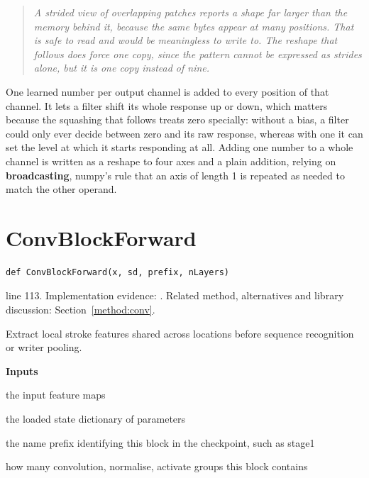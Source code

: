 \begin{quote}\small\itshape A strided view of overlapping patches reports a shape far larger than the memory behind it, because the same bytes appear at many positions. That is safe to read and would be meaningless to write to. The reshape that follows does force one copy, since the pattern cannot be expressed as strides alone, but it is one copy instead of nine.\end{quote}

One learned number per output channel is added to every position of that channel. It lets a filter shift its whole response up or down, which matters because the squashing that follows treats zero specially: without a bias, a filter could only ever decide between zero and its raw response, whereas with one it can set the level at which it starts responding at all. Adding one number to a whole channel is written as a reshape to four axes and a plain addition, relying on \textbf{broadcasting}, numpy's rule that an axis of length 1 is repeated as needed to match the other operand.



\section{ConvBlockForward}\label{fn:recognise:ConvBlockForward}
\begin{lstlisting}[style=sig]
def ConvBlockForward(x, sd, prefix, nLayers)
\end{lstlisting}
 line 113. Implementation evidence: \cite{code2026}. Related method, alternatives and library discussion: Section~\ref{method:conv}.


Extract local stroke features shared across locations before sequence recognition or writer pooling.




\noindent\textbf{Inputs}
\begin{description}[leftmargin=2.2em,style=nextline,font=\normalfont\ttfamily]\setlength\itemsep{1pt}
  \item[{x}] \normalfont the input feature maps
  \item[{sd}] \normalfont the loaded state dictionary of parameters
  \item[{prefix}] \normalfont the name prefix identifying this block in the checkpoint, such as stage1
  \item[{nLayers}] \normalfont how many convolution, normalise, activate groups this block contains
\end{description}

